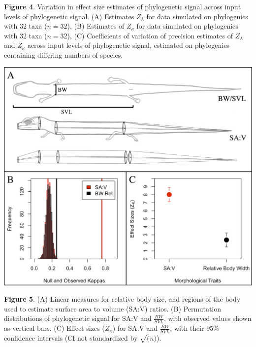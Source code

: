 \documentclass[
]{article}
\begin{document}
\singlespacing \textbf{Figure 4}. Variation in effect size estimates of
phylogenetic signal across input levels of phylogenetic signal. (A)
Estimates \(Z_\lambda\) for data simulated on phylogenies with 32 taxa
(\(n=32\)), (B) Estimates of \(Z_\kappa\) for data simulated on
phylogenies with 32 taxa (\(n=32\)), (C) Coefficients of variation of
precision estimates of \(Z_\lambda\) and \(Z_\kappa\) across input
levels of phylogenetic signal, estimated on phylogenies containing
differing numbers of species.

\includegraphics[width=0.95\linewidth]{Fig5}

\singlespacing \textbf{Figure 5}. (A) Linear measures for relative body
size, and regions of the body used to estimate surface area to volume
(SA:V) ratios. (B) Permutation distributions of phylogenetic signal for
SA:V and \(\frac{BW}{SVL}\), with observed values shown as vertical
bars. (C) Effect sizes (\(Z_\kappa\)) for SA:V and \(\frac{BW}{SVL}\),
with their 95\% confidence intervals (CI not standardized by
\(\sqrt(n)\)).
\end{document}
